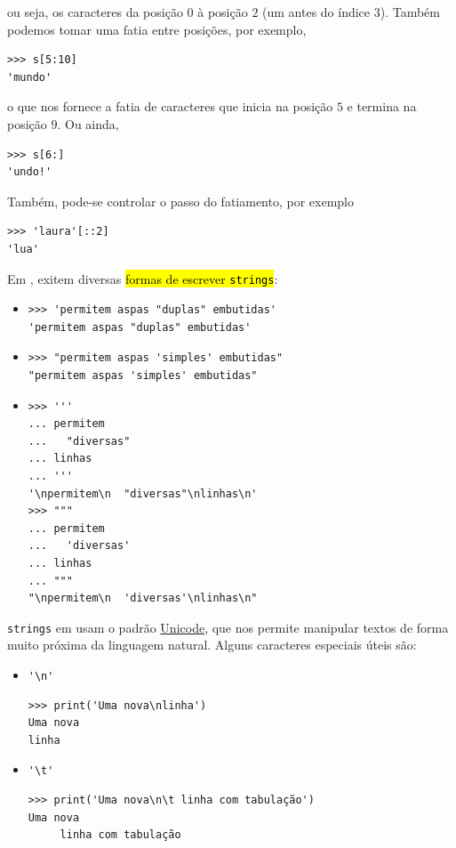 ou seja, os caracteres da posição $0$ à posição $2$ (um antes do índice $3$). Também podemos tomar uma fatia entre posições, por exemplo,

\begin{lstlisting}
>>> s[5:10]
'mundo'
\end{lstlisting}

o que nos fornece a fatia de caracteres que inicia na posição $5$ e termina na posição $9$. Ou ainda,

\begin{lstlisting}
>>> s[6:]
'undo!'
\end{lstlisting}

Também, pode-se controlar o passo do fatiamento, por exemplo

\begin{lstlisting}
>>> 'laura'[::2]
'lua'
\end{lstlisting}

Em {\python}, exitem diversas \hl{formas de escrever \texttt{strings}}:
\begin{itemize}
\item {}

\begin{lstlisting}[xrightmargin=2.5em]
>>> 'permitem aspas "duplas" embutidas'
'permitem aspas "duplas" embutidas'
\end{lstlisting}

\item {}

\begin{lstlisting}[xrightmargin=2.5em]
>>> "permitem aspas 'simples' embutidas"
"permitem aspas 'simples' embutidas"
\end{lstlisting}

\item {}

\begin{lstlisting}[xrightmargin=2.5em]
>>> '''
... permitem
...   "diversas"
... linhas
... '''
'\npermitem\n  "diversas"\nlinhas\n'
>>> """
... permitem
...   'diversas'
... linhas
... """
"\npermitem\n  'diversas'\nlinhas\n"
\end{lstlisting}
\end{itemize}

\texttt{strings} em {\python} usam o padrão \href{https://home.unicode.org/}{Unicode}, que nos permite manipular textos de forma muito próxima da linguagem natural. Alguns caracteres especiais úteis são:
\begin{itemize}
\item \lstinline+'\n'+ 

\begin{lstlisting}[xrightmargin=2.5em]
>>> print('Uma nova\nlinha')
Uma nova
linha
\end{lstlisting}

\item \lstinline+'\t'+ 

\begin{lstlisting}[xrightmargin=2.5em]
>>> print('Uma nova\n\t linha com tabulação')
Uma nova
 	 linha com tabulação
\end{lstlisting}
\end{itemize}

